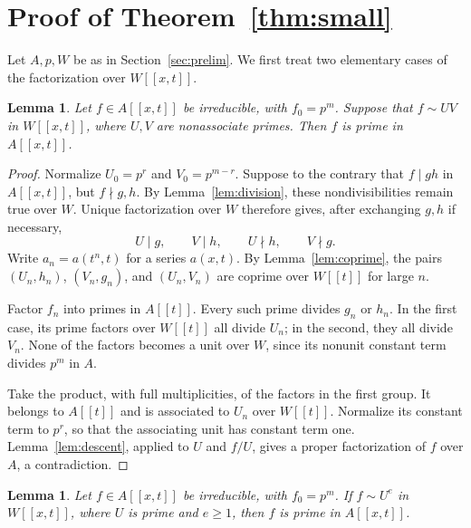 \documentclass[11pt]{amsart}
\newtheorem{lemma}[theorem]{Lemma}
\theoremstyle{remark}
\begin{document}
\section{Proof of Theorem~\ref{thm:small}}

Let $A,p,W$ be as in Section~\ref{sec:prelim}. We first treat
two elementary cases of the factorization over $W[[x,t]]$.

\begin{lemma}\label{lem:two}
Let $f\in A[[x,t]]$ be irreducible, with $f_0=p^m$. Suppose that
$f\sim UV$ in $W[[x,t]]$, where $U,V$ are nonassociate primes.
Then $f$ is prime in $A[[x,t]]$.
\end{lemma}

\begin{proof}
Normalize $U_0=p^r$ and $V_0=p^{m-r}$. Suppose to the contrary
that $f\mid gh$ in $A[[x,t]]$, but $f\nmid g,h$. By
Lemma~\ref{lem:division}, these nondivisibilities remain true over
$W$. Unique factorization over $W$ therefore gives, after exchanging
$g,h$ if necessary,
\[
 U\mid g,\qquad V\mid h,\qquad U\nmid h,\qquad V\nmid g.
\]
Write $a_n=a(t^n,t)$ for a series $a(x,t)$. By
Lemma~\ref{lem:coprime}, the pairs $(U_n,h_n)$, $(V_n,g_n)$,
and $(U_n,V_n)$ are coprime over $W[[t]]$ for large $n$.

Factor $f_n$ into primes in $A[[t]]$. Every such prime divides
$g_n$ or $h_n$. In the first case, its prime factors over $W[[t]]$
all divide $U_n$; in the second, they all divide $V_n$. None of
the factors becomes a unit over $W$, since its nonunit constant
term divides $p^m$ in $A$.

Take the product, with full multiplicities, of the factors in the
first group. It belongs to $A[[t]]$ and is associated to $U_n$
over $W[[t]]$. Normalize its constant term to $p^r$, so that the
associating unit has constant term one. Lemma~\ref{lem:descent},
applied to $U$ and $f/U$, gives a proper factorization of $f$
over $A$, a contradiction.
\end{proof}

\begin{lemma}\label{lem:pure}
Let $f\in A[[x,t]]$ be irreducible, with $f_0=p^m$. If
$f\sim U^e$ in $W[[x,t]]$, where $U$ is prime and $e\geq1$,
then $f$ is prime in $A[[x,t]]$.
\end{lemma}
\end{document}
